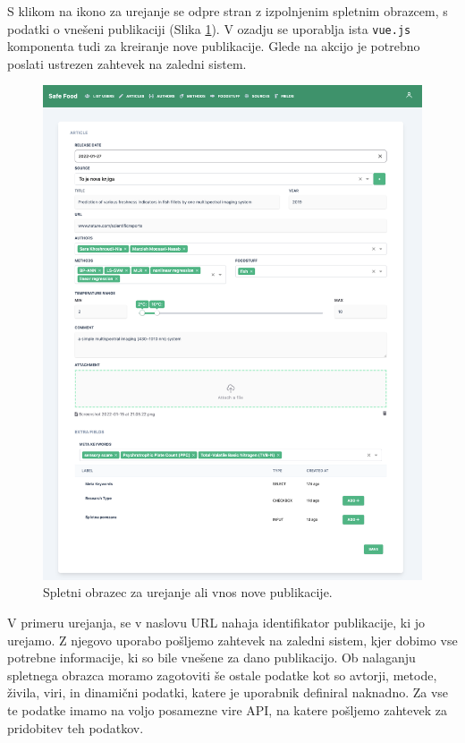 \documentclass[a4paper, 12pt]{book}
\begin{document}
S klikom na ikono za urejanje se odpre stran z izpolnjenim spletnim obrazcem, s podatki o vnešeni publikaciji (Slika \ref{edit-articles}). V ozadju se uporablja ista \verb=vue.js= komponenta tudi za kreiranje nove publikacije. Glede na akcijo je potrebno poslati ustrezen zahtevek na zaledni sistem.

\begin{figure}[h]
\begin{center}
\includegraphics[width=1\textwidth]{slike/form-create-article.png}
\end{center}
\caption{ Spletni obrazec za urejanje ali vnos nove publikacije. }
\label{edit-articles}
\end{figure}

V primeru urejanja, se v naslovu URL nahaja identifikator publikacije, ki jo urejamo. Z njegovo uporabo pošljemo zahtevek na zaledni sistem, kjer dobimo vse potrebne informacije, ki so bile vnešene za dano publikacijo. Ob nalaganju spletnega obrazca moramo zagotoviti še ostale podatke kot so avtorji, metode, živila, viri, in dinamični podatki, katere je uporabnik definiral naknadno. Za vse te podatke imamo na voljo posamezne vire API, na katere pošljemo zahtevek za pridobitev teh podatkov. 
\end{document}
